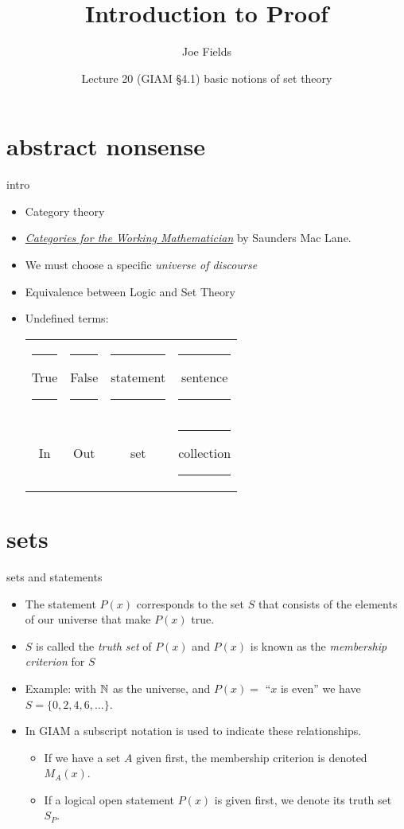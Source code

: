 \documentclass[handout,landscape]{beamer}
\author{Joe Fields}
\title{Introduction to Proof}
\date{Lecture 20 (GIAM \S 4.1) \newline basic notions of set theory}
\institute[SCSU]{ {\tt fieldsj1@southernct.edu} }
\begin{document}
\begin{frame}[plain]
  \titlepage
\end{frame}

\section{abstract nonsense}

\begin{frame}{intro}
\begin{itemize}
\item Category theory \pause
\item \href{https://www.amazon.com/Categories-Working-Mathematician-Graduate-Mathematics/dp/1441931236}{{\em Categories for the Working Mathematician}} by Saunders Mac Lane.\pause
\item We must choose a specific {\em universe of discourse} \pause
\item Equivalence between Logic and Set Theory\pause
\item Undefined terms:\pause \newline
\begin{tabular}{cccc}
	\rule[-6pt]{0pt}{24pt} \rule{12pt}{0pt} True \rule{12pt}{0pt} & \rule{12pt}{0pt}  False \rule{12pt}{0pt} & \rule{12pt}{0pt}  statement \rule{12pt}{0pt} & \rule{12pt}{0pt} sentence \rule{12pt}{0pt}  \\ \pause
	\rule[-6pt]{0pt}{24pt}In   & Out   & set       & \rule{12pt}{0pt} collection \rule{12pt}{0pt} \\
\end{tabular}
\end{itemize}
\end{frame}

\section{sets}

\begin{frame}{sets and statements}
\begin{itemize}
\item The statement $P(x)$ corresponds to the set $S$ that consists of the elements of our universe that make $P(x)$ true. \pause
\item $S$ is called the {\em truth set} of $P(x)$ and $P(x)$ is known as the {\em membership criterion} for $S$ \pause
\item Example:  with ${\mathbb N}$ as the universe, and $P(x) = $ ``$x$ is even'' we have $S = \{ 0, 2, 4, 6, \ldots \}$.\pause 
\item In GIAM a subscript notation is used to indicate these relationships.\pause
\begin{itemize}
  \item If we have a set $A$ given first, the membership criterion is denoted $M_A(x)$.\pause
  \item If a logical open statement $P(x)$ is given first, we denote its truth set $S_P$.
\end{itemize}
\end{itemize}
\end{frame}
\end{document}
